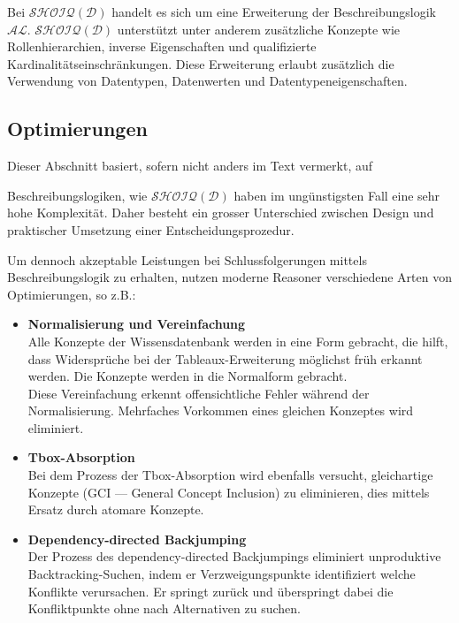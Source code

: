 Bei $\mathcal{SHOIQ}(\mathcal{D})$ handelt es sich um eine Erweiterung der Beschreibungslogik $\mathcal{AL}$. $\mathcal{SHOIQ}(\mathcal{D})$ unterstützt unter anderem zusätzliche Konzepte wie Rollenhierarchien, inverse Eigenschaften und qualifizierte Kardinalitätseinschränkungen. Diese Erweiterung erlaubt zusätzlich die Verwendung von Datentypen, Datenwerten und Datentypeneigenschaften.~\cite{wiki:desclog}

\subsection{Optimierungen}
\label{subsection:inferenz_pellet_opti}
Dieser Abschnitt basiert, sofern nicht anders im Text vermerkt, auf~\cite[Seiten 16 bis 19]{sirin:pellet05}

Beschreibungslogiken, wie $\mathcal{SHOIQ}(\mathcal{D})$ haben im ungünstigsten Fall eine sehr hohe Komplexität. Daher besteht ein grosser Unterschied zwischen Design und praktischer Umsetzung einer Entscheidungsprozedur.

Um dennoch akzeptable Leistungen bei Schlussfolgerungen mittels Beschreibungslogik zu erhalten, nutzen moderne Reasoner verschiedene Arten von Optimierungen, so z.B.:

\begin{itemize}
    \item \textbf{Normalisierung und Vereinfachung}\\
        Alle Konzepte der Wissensdatenbank werden in eine Form gebracht, die hilft, dass Widersprüche bei der Tableaux-Erweiterung möglichst früh erkannt werden. Die Konzepte werden in die Normalform gebracht.\\
        Diese Vereinfachung erkennt offensichtliche Fehler während der Normalisierung. Mehrfaches Vorkommen eines gleichen Konzeptes wird eliminiert.

    \item \textbf{Tbox-Absorption}\\
        Bei dem Prozess der Tbox-Absorption wird ebenfalls versucht, gleichartige Konzepte (GCI --- General Concept Inclusion) zu eliminieren, dies mittels Ersatz durch atomare Konzepte.

    \item \textbf{Dependency-directed Backjumping}\\
        Der Prozess des dependency-directed Backjumpings eliminiert unproduktive Backtracking-Suchen, indem er Verzweigungspunkte identifiziert welche Konflikte verursachen. Er springt zurück und überspringt dabei die Konfliktpunkte ohne nach Alternativen zu suchen.
\end{itemize}

